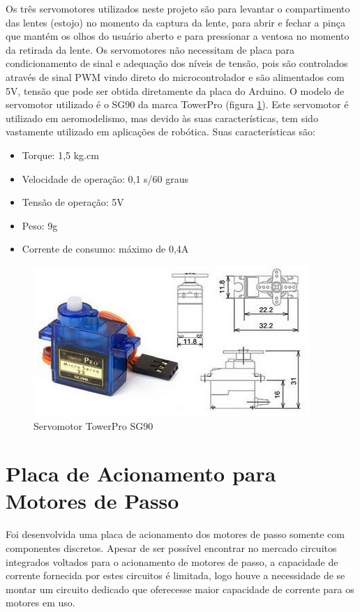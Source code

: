 Os três servomotores utilizados neste projeto são para levantar o compartimento das lentes (estojo) no momento da captura da lente, para abrir e fechar a pinça que mantém os olhos do usuário aberto e para pressionar a ventosa no momento da retirada da lente. Os servomotores não necessitam de placa para condicionamento de sinal e adequação dos níveis de tensão, pois são controlados através de sinal PWM vindo direto do microcontrolador e são alimentados com 5V, tensão que pode ser obtida diretamente da placa do Arduino. O modelo de servomotor utilizado é o SG90 da marca TowerPro (figura \ref{sg90}). Este servomotor é utilizado em aeromodelismo, mas devido às suas características, tem sido vastamente utilizado em aplicações de robótica. Suas características são:
\begin{itemize}
	\item Torque: 1,5 kg.cm
	\item Velocidade de operação: 0,1 s/60 graus
	\item Tensão de operação: 5V
	\item Peso: 9g
	\item Corrente de consumo: máximo de 0,4A 
\end{itemize}

\begin{figure}[H]
		\centering
			\includegraphics[scale=1.0]{figuras/SG90.png}
		\caption{Servomotor TowerPro SG90}
		\label{sg90}
\end{figure}


\section[Placa de Acionamento para Motores de Passo]{Placa de Acionamento para Motores de Passo}

Foi desenvolvida uma placa de acionamento dos motores de passo somente com componentes discretos. Apesar de ser possível encontrar no mercado circuitos integrados voltados para o acionamento de motores de passo, a capacidade de corrente fornecida por estes circuitos é limitada, logo houve a necessidade de se montar um circuito dedicado que oferecesse maior capacidade de corrente para os motores em uso.

